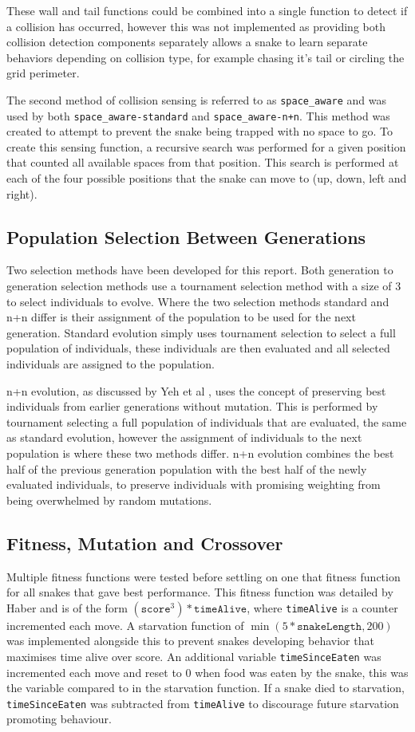 These wall and tail functions could be combined into a single function to detect if a collision has occurred, however this was not implemented as providing both collision detection components separately allows a snake to learn separate behaviors depending on collision type, for example chasing it's tail or circling the grid perimeter.

The second method of collision sensing is referred to as \verb|space_aware| and was used by both \verb|space_aware-standard| and \verb|space_aware-n+n|. This method was created to attempt to prevent the snake being trapped with no space to go. To create this sensing function, a recursive search was performed for a given position that counted all available spaces from that position. This search is performed at each of the four possible positions that the snake can move to (up, down, left and right).

\subsection{Population Selection Between Generations}
Two selection methods have been developed for this report. Both generation to generation selection methods use a tournament selection method with a size of 3 to select individuals to evolve. Where the two selection methods standard and n+n differ is their assignment of the population to be used for the next generation. Standard evolution simply uses tournament selection to select a full population of individuals, these individuals are then evaluated and all selected individuals are assigned to the population. 

n+n evolution, as discussed by Yeh et al \cite{nplusn}, uses the concept of preserving best individuals from earlier generations without mutation. This is performed by tournament selecting a full population of individuals that are evaluated, the same as standard evolution, however the assignment of individuals to the next population is where these two methods differ. n+n evolution combines the best half of the previous generation population with the best half of the newly evaluated individuals, to preserve individuals with promising weighting from being overwhelmed by random mutations.

\subsection{Fitness, Mutation and Crossover}
Multiple fitness functions were tested before settling on one that fitness function for all snakes that gave best performance. This fitness function was detailed by Haber \cite{craig} and is of the form $(\texttt{score}^3) * \texttt{timeAlive}$, where \texttt{timeAlive} is a counter incremented each move. A starvation function of $\min(5 * \texttt{snakeLength}, 200)$ was implemented alongside this to prevent snakes developing behavior that maximises time alive over score. An additional variable \texttt{timeSinceEaten} was incremented each move and reset to 0 when food was eaten by the snake, this was the variable compared to in the starvation function. If a snake died to starvation, \texttt{timeSinceEaten} was subtracted from \texttt{timeAlive} to discourage future starvation promoting behaviour.

